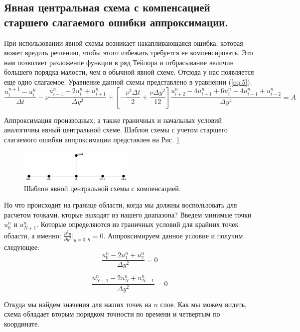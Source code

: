 \subsection{Явная центральная схема с компенсацией старшего слагаемого ошибки аппроксимации.}
При использовании явной схемы возникает накапливающаяся ошибка, которая может вредить решению, чтобы этого избежать требуется ее компенсировать. Это нам позволяет разложение функции в ряд Тейлора и отбрасывание величин большего порядка малости, чем в обычной явной схеме. Отсюда у нас появляется еще одно слагаемое. Уравнение данной схемы представлено в уравнении (\ref{eq:5}).
\begin{equation}
    \frac{u^{n+1}_i-u^n_i}{\Delta t} - \nu \frac{u^n_{i-1}-2u^n_i+u^n_{i+1}}{\Delta y^2} + \left[-\frac{\nu^2 \Delta t}{2} + \frac{\nu \Delta y^2}{12} \right] \frac{u^n_{i+2}-4u^n_{i+1}+6u^n_i-4u^n_{i-1}+u^n_{i-2}}{\Delta y^4} = A
\label{eq:5}
\end{equation}

Аппроксимация производных, а также граничных и начальных условий аналогичны явный центральной схеме. Шаблон схемы с учетом старшего слагаемого ошибки аппроксимации представлен на Рис. \ref{fig:3}

\begin{figure}[H]
    \centering
    \includegraphics[width=0.5\textwidth]{images/3.png}
    \caption {Шаблон явной центральной схемы с компенсацией.}
    \label{fig:3}
\end{figure}

Но что происходит на границе области, когда мы должны воспользовать для расчетом точками. кторые выходят из нашего диапазона? Введем минимые точки $u^n_0$ и $u^n_{N+1}$. Которые определяются из граничных условий для крайних точек области, а именно: $\frac{\partial^2 u}{\partial y^2}\vert_{y=0,h}=0$. Аппроксимируем данное условие и получим следующее:
\begin{equation}
    \frac{u^n_0-2u^n_1+u^n_2}{\Delta y^2}=0
\label{eq:6}
\end{equation} 

\begin{equation}
    \frac{u^n_{N+1}-2u^n_N+u^n_{N-1}}{\Delta y^2}=0
\label{eq:7}
\end{equation}

Откуда мы найдем значения для наших точек на $n$ слое. Как мы можем видеть, схема обладает вторым порядком точности по времени и четвертым по координате.

